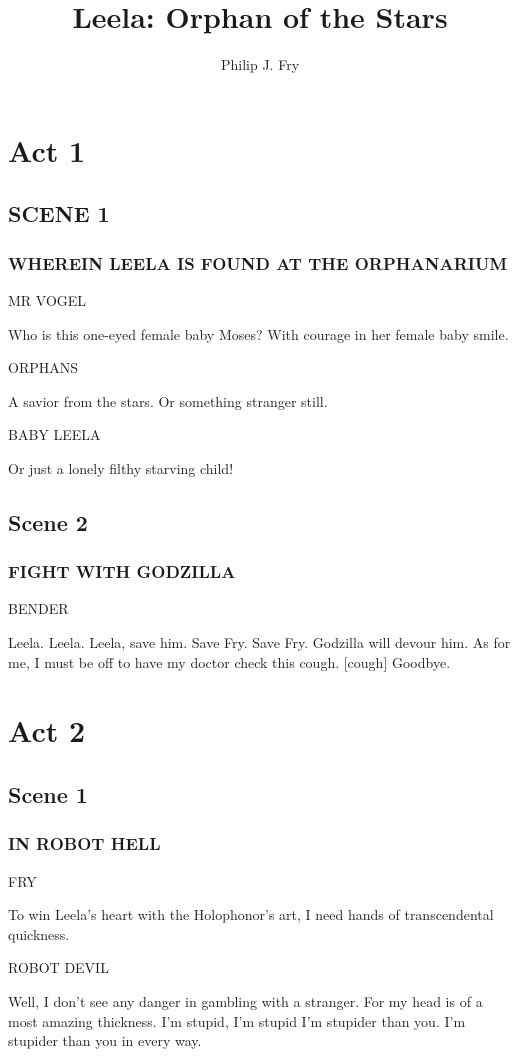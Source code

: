 \documentclass[12pt]{article}
\title{Leela: Orphan of the Stars}
\author{Philip J. Fry}
\begin{document}
\maketitle

\section*{Act 1}

\subsection*{SCENE 1}

\subsubsection*{WHEREIN LEELA IS FOUND AT THE ORPHANARIUM}

MR VOGEL

Who is this one-eyed female baby Moses?
With courage in her female baby smile.

ORPHANS

A savior from the stars.
Or something stranger still.

BABY LEELA

Or just a lonely filthy starving child!

\subsection*{Scene 2}

\subsubsection*{FIGHT WITH GODZILLA}

BENDER

Leela. Leela. Leela, save him.
Save Fry. Save Fry.
Godzilla will devour him.
As for me, I must be off
to have my doctor check this cough.
[cough] Goodbye.

\section*{Act 2}

\subsection*{Scene 1}

\subsubsection*{IN ROBOT HELL}

FRY

To win Leela's heart
with the Holophonor's art,
I need hands of transcendental quickness.

ROBOT DEVIL

Well, I don't see any danger
in gambling with a stranger.
For my head is of a most amazing thickness.
I'm stupid, I'm stupid
I'm stupider than you.
I'm stupider than you in every way.
\end{document}

